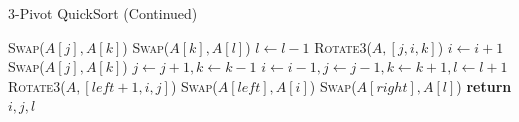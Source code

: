 \documentclass[a4paper,oneside,12pt]{book}
\begin{document}
    \begin{algorithm}
        \caption{3-Pivot QuickSort (Continued)}
        \begin{algorithmic}

                        \State \textsc{Swap}($A[j], A[k]$) 
                    \EndIf
                    \State \textsc{Swap}($A[k], A[l]$)
                    \State $l \gets l - 1$
                \Else {}
                        \State \textsc{Rotate3}($A, [j, i, k]$)
                        \State $i \gets i + 1$
                    \Else
                        \State \textsc{Swap}($A[j], A[k]$)
                    \EndIf
                \EndIf
                \State $j \gets j + 1, k \gets k - 1$
            \EndIf
        \EndWhile
        \State $i \gets i - 1, j \gets j - 1, k \gets k + 1, l \gets l + 1$
        \State \textsc{Rotate3}($A, [left + 1, i, j]$)
        \State \textsc{Swap}($A[left], A[i]$)
        \State \textsc{Swap}($A[right], A[l]$)
        \State \textbf{return} $i, j, l$
        \EndProcedure
    \end{algorithmic}
\end{algorithm}
\end{document}

